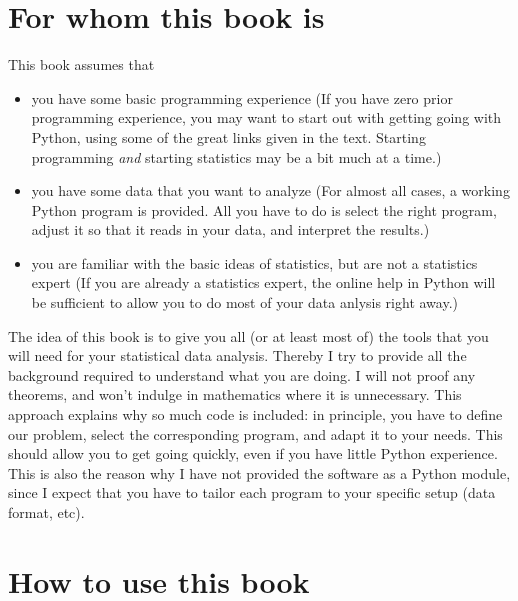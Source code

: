 \section*{For whom this book is}

This book assumes that

\begin{itemize}
  \item you have some basic programming experience (If you have zero prior programming experience, you may want to start out with getting going with Python, using some of the great links given in the text. Starting programming \emph{and} starting statistics may be a bit much at a time.)
  \item you have some data that you want to analyze (For almost all cases, a working Python program is provided. All you have to do is select the right program, adjust it so that it reads in your data, and interpret the results.)
  \item you are familiar with the basic ideas of statistics, but are not a statistics expert (If you are already a statistics expert, the online help in Python will be sufficient to allow you to do most of your data anlysis right away.)
\end{itemize}


The idea of this book is to give you all (or at least most of) the tools
that you will need for your statistical data analysis. Thereby I try to
provide all the background required to understand what you are doing. I
will not proof any theorems, and won't indulge in mathematics where it
is unnecessary. This approach explains why so much code is included: in
principle, you have to define our problem, select the corresponding
program, and adapt it to your needs. This should allow you to get going
quickly, even if you have little Python experience. This is also the
reason why I have not provided the software as a Python module, since I
expect that you have to tailor each program to your specific setup (data
format, etc).

\section*{How to use this book}

